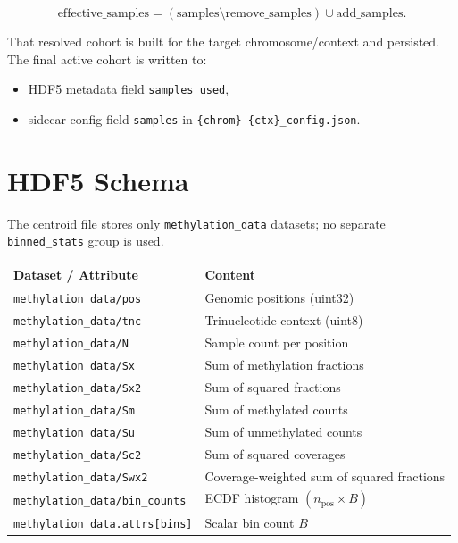 \documentclass[11pt]{article}
\begin{document}
\begin{equation}
  \text{effective\_samples}
  = (\text{samples} \setminus \text{remove\_samples})
    \cup \text{add\_samples}.
\end{equation}

That resolved cohort is built for the target chromosome/context and
persisted.  The final active cohort is written to:

\begin{itemize}
  \item HDF5 metadata field \texttt{samples\_used},
  \item sidecar config field \texttt{samples} in
        \texttt{\{chrom\}-\{ctx\}\_config.json}.
\end{itemize}

\section{HDF5 Schema}

The centroid file stores only \texttt{methylation\_data} datasets; no
separate \texttt{binned\_stats} group is used.

\begin{center}
\begin{tabular}{@{}ll@{}}
\toprule
Dataset / Attribute & Content \\
\midrule
\texttt{methylation\_data/pos}        & Genomic positions (uint32) \\
\texttt{methylation\_data/tnc}        & Trinucleotide context (uint8) \\
\texttt{methylation\_data/N}          & Sample count per position \\
\texttt{methylation\_data/Sx}         & Sum of methylation fractions \\
\texttt{methylation\_data/Sx2}        & Sum of squared fractions \\
\texttt{methylation\_data/Sm}         & Sum of methylated counts \\
\texttt{methylation\_data/Su}         & Sum of unmethylated counts \\
\texttt{methylation\_data/Sc2}        & Sum of squared coverages \\
\texttt{methylation\_data/Swx2}       & Coverage-weighted sum of squared fractions \\
\texttt{methylation\_data/bin\_counts}& ECDF histogram \((n_\text{pos}\times B)\) \\
\texttt{methylation\_data.attrs[bins]}& Scalar bin count \(B\) \\
\bottomrule
\end{tabular}
\end{center}
\end{document}
